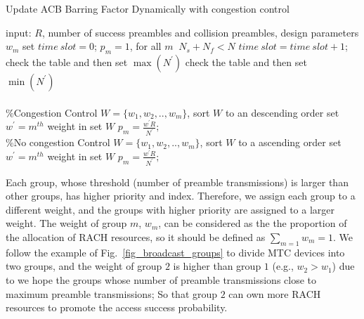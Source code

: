      \begin{algorithm}
      \caption{Update ACB Barring Factor Dynamically with congestion control}
        \begin{algorithmic}[1]
        \State input: $R$, number of success preambles and collision preambles, design parameters $w_m$
        \State set $time\ slot=0$; $p_m=1$, for all $m$
        \While $\ N_s+N_f<N$
        \State $time\ slot= time\ slot + 1$;
         \State check the table and then set $\max(N^\prime)$
          \Else
          \State check the table and then set $\min(N^\prime)$ \\
                \\
                \%{Congestion Control}
                   \State $W=\{w_1,w_2,..,w_m\}$, sort $W$ to an descending order
                   \State set $w^\prime = m^{th}$ weight in set $W$
                   \State $p_{m}=\frac{w^\prime R}{N^\prime};$
                \Else \\
                \%{No congestion Control}
                   \State $W=\{w_1,w_2,..,w_m\}$, sort $W$ to a ascending order
                   \State set $w^\prime = m^{th}$ weight in set $W$
                   \State $p_{m}=\frac{w^\prime R}{N^\prime};$
                \EndIf
            \EndIf
          \EndWhile
          \end{algorithmic}
     \end{algorithm}
    Each group, whose threshold (number of preamble transmissions) is larger than other groups, has higher priority and index. Therefore, we assign each group to a different weight, and the groups with higher priority are assigned to a larger weight. The weight of group $m$, $w_m$, can be considered as the the proportion of the allocation of RACH resources, so it should be defined as $\sum_{m=1} w_m=1$. We follow the example of Fig.~\ref{fig_broadcast_groups} to divide MTC devices into two groups, and the weight of group $2$ is higher than group $1$ (e.g., $w_2>w_1$) due to we hope the groups whose number of preamble transmissions close to maximum preamble transmissions; So that group $2$ can own more RACH resources to promote the access success probability.

